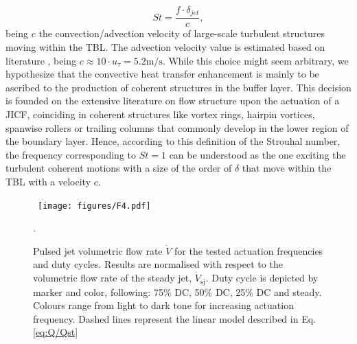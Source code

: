 %
\begin{equation}\label{eq:St}
    St = \frac{f \cdot \delta_{jet}}{c},
\end{equation}
%
being $c$ the convection/advection velocity of large-scale turbulent structures moving within the TBL. The advection velocity value is estimated based on literature \citep{Krogstad1998convvel,jimenez2004lsturb}, being $c \approx 10\cdot u_\tau = 5.2 \mathrm{m/s}$. 
While this choice might seem arbitrary, we hypothesize that the convective heat transfer enhancement is mainly to be ascribed to the production of coherent structures in the buffer layer. This decision is founded on the extensive literature on flow structure upon the actuation of a JICF, coinciding in coherent structures like vortex rings, hairpin vortices, spanwise rollers or trailing columns that commonly develop in the lower region of the boundary layer. Hence, according to this definition of the Strouhal number, the frequency corresponding to $St = 1$ can be understood as the one exciting the turbulent coherent motions with a size of the order of $\delta$ that move within the TBL with a velocity $c$. 

\begin{figure}[t] %
    \centering\
    \texttt{[image: figures/F4.pdf]}
    \caption{Pulsed jet volumetric flow rate $\dot{V}$ for the tested actuation frequencies and duty cycles. Results are normalised with respect to the volumetric flow rate of the steady jet, $\dot{V}_{\mathrm{sj}}$. Duty cycle is depicted by marker and color, following: 75\% DC, 50\% DC, 25\% DC and  steady. Colours range from light to dark tone for increasing actuation frequency. Dashed lines represent the linear model described in Eq.\eqref{eq:Q/Qst}}.
    \label{fig:mdot}
\end{figure}


